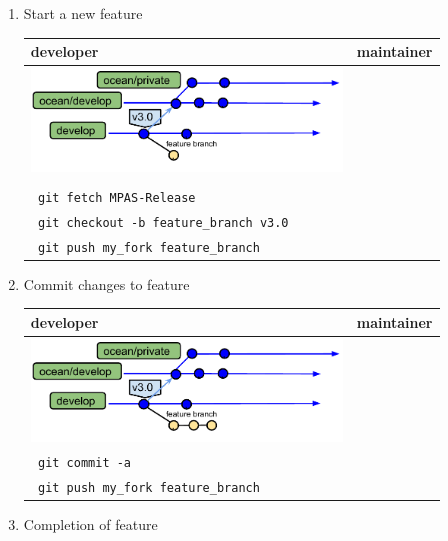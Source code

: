 \documentclass[11pt]{article}
\begin{document}
\begin{enumerate}
\item Start a new feature

 \begin{tabular}[c]{L{3.3in}|L{3.3in}}
developer & maintainer \\
\hline
\includegraphics[width=3.25in]{f/MPASworkflow_ext1.pdf} \\
\\
\verb| git fetch MPAS-Release| \\
\verb| git checkout -b feature_branch v3.0 | \\
\verb| git push my_fork feature_branch|  & 
 \end{tabular}

\item Commit changes to feature 

 \begin{tabular}[c]{L{3.3in}|L{3.3in}}
developer & maintainer \\
\hline
\includegraphics[width=3.25in]{f/MPASworkflow_ext2.pdf} \\
\verb| git commit -a|  \\
\verb| git push my_fork feature_branch|  
 \end{tabular}

\item Completion of feature


\end{enumerate}
\end{document}
